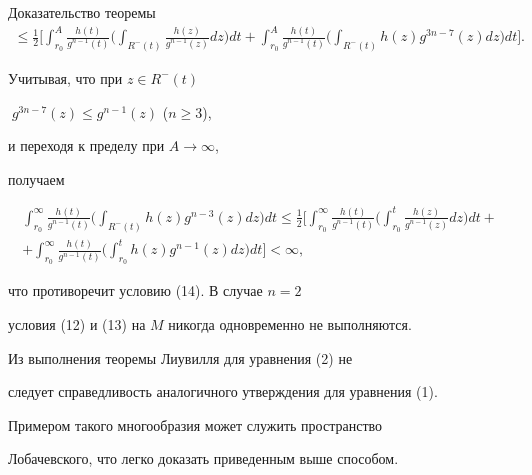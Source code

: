 \begin{pf*}{Доказательство теоремы}
\begin{gather*}
\le \frac{1}{2}\biggl[\int_{r_0}^{A}\frac{h(t)}{g^{n-1}(t)}


\biggl(\int_{R^{-}(t)}\frac{h(z)}{g^{n-1}(z)}dz\biggr)dt +


\int_{r_0}^{A}\frac{h(t)}{g^{n-1}(t)}


\biggl(\int_{R^{-}(t)}h(z)g^{3n-7}(z)dz\biggr)dt\biggr].


\end{gather*}





Учитывая, что при $z\in R^{-}(t)$


$\;g^{3n-7}(z) \le g^{n-1}(z)$ ($n\ge 3$),


и переходя к пределу при $ A \to \infty$,


получаем


\begin{gather*}


\int_{r_0}^{\infty}\frac{h(t)}{g^{n-1}(t)}\biggl(\int_{R^{-}(t)}


h(z)g^{n-3}(z)dz\biggr)dt \le 


\frac{1}{2}\biggl[ \int_{r_0}^{\infty}\frac{h(t)}{g^{n-1}(t)}


\biggl( \int_{r_0}^{t}\frac{h(z)}{g^{n-1}(z)}dz\biggr)dt + \\


%


+ \int_{r_0}^{\infty}\frac{h(t)}{g^{n-1}(t)}


\biggl(\int_{r_0}^{t}h(z)g^{n-1}(z)dz\biggr)dt\biggr] < \infty,


\end{gather*}


что противоречит условию (14). В случае $n=2$


условия (12) и (13) на $M$ никогда одновременно не выполняются.


\end{pf*}





\begin{note} Из выполнения теоремы Лиувилля для уравнения (2) не


следует справедливость аналогичного утверждения для уравнения (1).


Примером такого многообразия может служить пространство


Лобачевского, что легко доказать приведенным выше способом.


\end{note}





